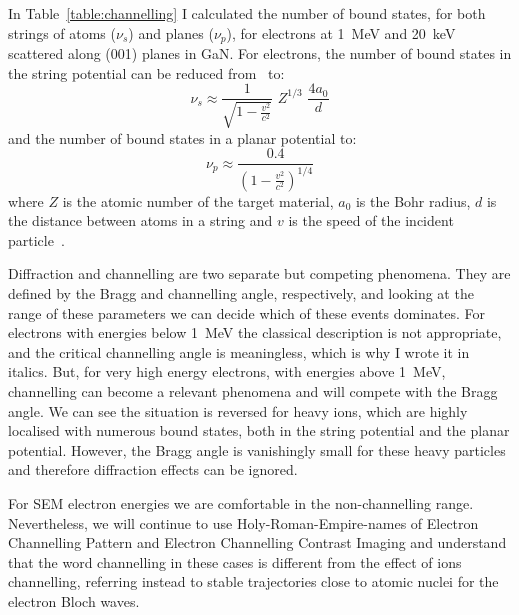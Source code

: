 In Table~\ref{table:channelling} I calculated the number of bound states, for both strings of atoms ($\nu_s$) and planes ($\nu_p$), for electrons at \SI{1}{\mega \electronvolt} and \SI{20}{\kilo \electronvolt} scattered along \hkl(001) planes in GaN. For electrons, the number of bound states in the string potential can be reduced from~\cite{Lindhard65} to:
\begin{equation*}
\nu_s \approx \frac{1}{\sqrt{1-\frac{v^2}{c^2}}}\,\, Z^{1/3} \,\, \frac{4a_0}{d}
\end{equation*}
and the number of bound states in a planar potential to:
\begin{equation*}
\nu_p \approx \frac{0.4}{(1-\frac{v^2}{c^2})^{1/4}} 
\end{equation*}
where $Z$ is the atomic number of the target material, $a_0$ is the Bohr radius, $d$ is the distance between atoms in a string and $v$ is the speed of the incident particle~\cite{Uggerhoj69}.  

Diffraction and channelling are two separate but competing phenomena. They are defined by the Bragg and channelling angle, respectively, and looking at the range of these parameters we can decide which of these events dominates. For electrons with energies below \SI{1}{\mega \electronvolt} the classical description is not appropriate, and the critical channelling angle is meaningless, which is why I wrote it in italics. But, for very high energy electrons, with energies above \SI{1}{\mega \electronvolt}, channelling can become a relevant phenomena and will compete with the Bragg angle. We can see the situation is reversed for heavy ions, which are highly localised with numerous bound states, both in the string potential and the planar potential. However, the Bragg angle is vanishingly small for these heavy particles and therefore diffraction effects can be ignored. 

For SEM electron energies we are comfortable in the non-channelling range. Nevertheless, we will continue to use Holy-Roman-Empire-names of Electron Channelling Pattern and Electron Channelling Contrast Imaging and understand that the word channelling in these cases is different from the effect of ions channelling, referring instead to stable trajectories close to atomic nuclei for the electron Bloch waves. 





